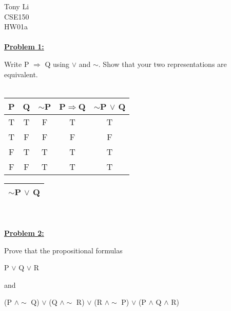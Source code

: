 \documentclass[11pt]{article}
\begin{document}
\noindent 
Tony Li \\
CSE150 \\
HW01a \\\\
	\textbf{\underline{Problem 1:}}


	Write P $\Rightarrow$ Q using $\vee$ and $\sim$. Show that your two representations are equivalent.
	\\
	\\
	
	\begin{minipage}{0.5\textwidth}
		\begin{tabular}{||c c c c c||} 
 		\hline
 		P & Q & $\sim$P & P$\Rightarrow$Q & $\sim$P $\vee$ Q\\ [0.5ex] 
 		\hline\hline
 		T & T & F & T & T\\ 
 		\hline
 		T & F & F & F & F\\
 		\hline
 		F & T & T & T & T\\
 		\hline
 		F & F & T & T & T\\
 		\hline
		\end{tabular}
	\end{minipage}
	\begin{minipage}{0.5\textwidth}
	
		\begin{tabular}{|c|}
		\arrayrulecolor{red}\hline
		$\sim$P $\vee$ Q\\[0.5ex]
		\hline
		\end{tabular}
	\end{minipage}\\\\

	\noindent
	\textbf{\underline{Problem 2:}} 


	Prove that the propositional formulas 
	\begin{center}
		P $\vee$ Q $\vee$ R
	\end{center}

	and
		
	\begin{center}
		(P $\wedge \sim$ Q) $\vee$ (Q $\wedge \sim$ R) $\vee$ (R $\wedge \sim$ P) $\vee$ (P $\wedge$ Q $\wedge$ R) 
	\end{center}
\end{document}
